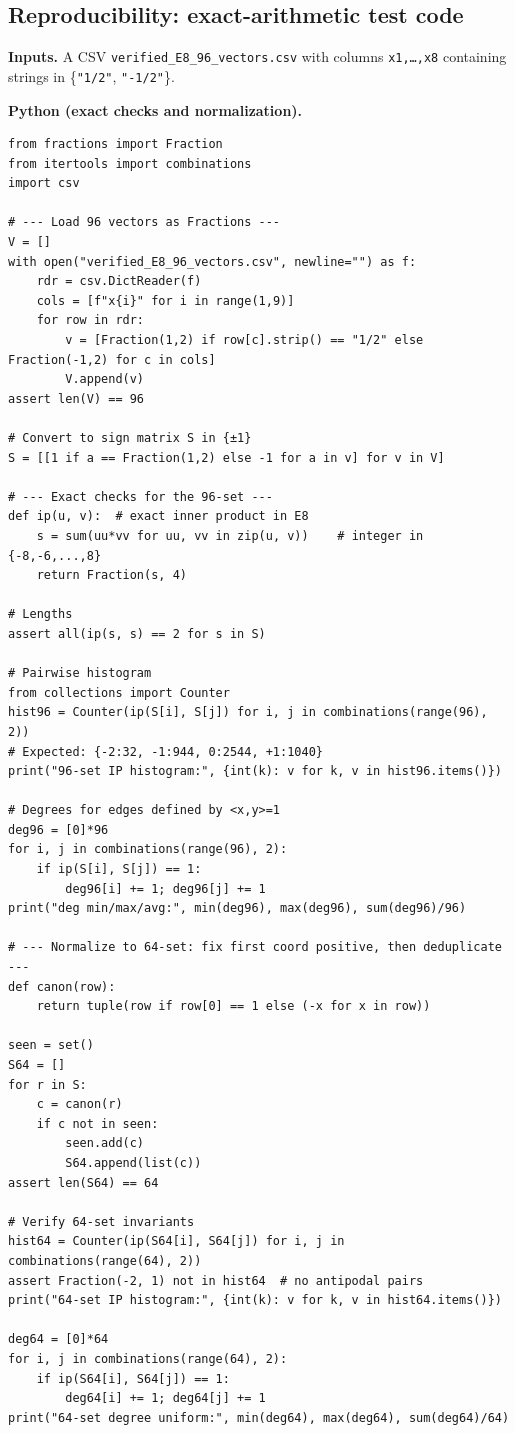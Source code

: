 \documentclass[12pt]{article}
\begin{document}
\subsection*{Reproducibility: exact-arithmetic test code}
\noindent\textbf{Inputs.} A CSV \texttt{verified\_E8\_96\_vectors.csv} with columns \texttt{x1,\dots,x8} containing strings in \{\texttt{"1/2"}, \texttt{"-1/2"}\}.
\medskip

\noindent\textbf{Python (exact checks and normalization).}
\begin{verbatim}
from fractions import Fraction
from itertools import combinations
import csv

# --- Load 96 vectors as Fractions ---
V = []
with open("verified_E8_96_vectors.csv", newline="") as f:
    rdr = csv.DictReader(f)
    cols = [f"x{i}" for i in range(1,9)]
    for row in rdr:
        v = [Fraction(1,2) if row[c].strip() == "1/2" else Fraction(-1,2) for c in cols]
        V.append(v)
assert len(V) == 96

# Convert to sign matrix S in {±1}
S = [[1 if a == Fraction(1,2) else -1 for a in v] for v in V]

# --- Exact checks for the 96-set ---
def ip(u, v):  # exact inner product in E8
    s = sum(uu*vv for uu, vv in zip(u, v))    # integer in {-8,-6,...,8}
    return Fraction(s, 4)

# Lengths
assert all(ip(s, s) == 2 for s in S)

# Pairwise histogram
from collections import Counter
hist96 = Counter(ip(S[i], S[j]) for i, j in combinations(range(96), 2))
# Expected: {-2:32, -1:944, 0:2544, +1:1040}
print("96-set IP histogram:", {int(k): v for k, v in hist96.items()})

# Degrees for edges defined by <x,y>=1
deg96 = [0]*96
for i, j in combinations(range(96), 2):
    if ip(S[i], S[j]) == 1:
        deg96[i] += 1; deg96[j] += 1
print("deg min/max/avg:", min(deg96), max(deg96), sum(deg96)/96)

# --- Normalize to 64-set: fix first coord positive, then deduplicate ---
def canon(row):
    return tuple(row if row[0] == 1 else (-x for x in row))

seen = set()
S64 = []
for r in S:
    c = canon(r)
    if c not in seen:
        seen.add(c)
        S64.append(list(c))
assert len(S64) == 64

# Verify 64-set invariants
hist64 = Counter(ip(S64[i], S64[j]) for i, j in combinations(range(64), 2))
assert Fraction(-2, 1) not in hist64  # no antipodal pairs
print("64-set IP histogram:", {int(k): v for k, v in hist64.items()})

deg64 = [0]*64
for i, j in combinations(range(64), 2):
    if ip(S64[i], S64[j]) == 1:
        deg64[i] += 1; deg64[j] += 1
print("64-set degree uniform:", min(deg64), max(deg64), sum(deg64)/64)
\end{verbatim}
\end{document}
